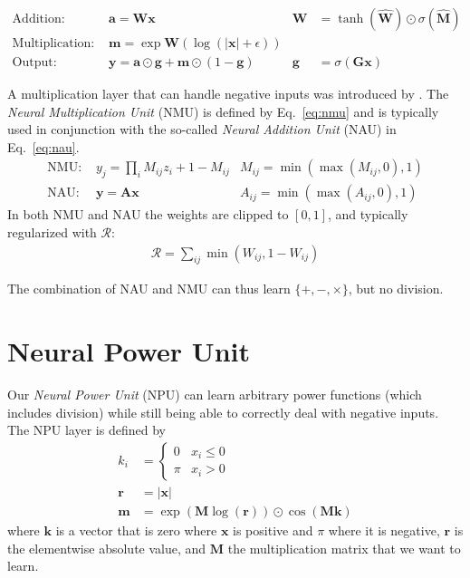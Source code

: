 \documentclass[9pt]{article}
\begin{document}
\begin{align}
  \label{eq:nalu_add}
  \text{Addition: }       & \bm a = \bm W \bm x
                          & \bm W& = \tanh(\hat{\bm W}) \odot \sigma(\hat{\bm M}) \\
  \label{eq:nalu_mult}
  \text{Multiplication: } & \bm m = \exp \bm W(\log(|\bm x|+\epsilon)) & &\\
  \text{Output: }         & \bm y = \bm a \odot \bm g + \bm m \odot (1-\bm g) 
                          & \bm g& = \sigma(\bm G\bm x)
\end{align}

A multiplication layer that can handle negative inputs was introduced by \citet{madsen_neural_2020}.
The \emph{Neural Multiplication Unit} (NMU) is defined by Eq.~\ref{eq:nmu} and is typically used in
conjunction with the so-called \emph{Neural Addition Unit} (NAU) in Eq.~\ref{eq:nau}.
\begin{align}
  \label{eq:nmu}
  \text{NMU: } &y_j = \prod_i M_{ij} z_{i} + 1 - M_{ij}  &M_{ij}=\min(\max(M_{ij}, 0), 1)\\
  \label{eq:nau}
  \text{NAU: } &\bm y = \bm A \bm x &A_{ij}=\min(\max(A_{ij}, 0), 1)
\end{align}
In both NMU and NAU the weights are clipped to $[0,1]$, and typically regularized
with $\mathcal{R}$:
\begin{align}
  \label{eq:rsparse}
  \mathcal{R} = \sum_{ij} \min(W_{ij}, 1-W_{ij})
\end{align}

The combination of NAU and NMU can thus learn $\{+,-,\times\}$, but no division.




\section{Neural Power Unit}%
\label{sec:neural_power_unit}

Our \emph{Neural Power Unit} (NPU) can learn arbitrary power functions (which
includes division) while still being able to correctly deal with negative
inputs.  The NPU layer is defined by
\begin{align}
  k_i &= \begin{cases}
     0  & x_i \leq 0 \\
    \pi & x_i > 0
  \end{cases} \\
  \bm r &= |\bm x| \\
  \bm m &= \exp(\bm M \log(\bm r)) \odot \cos(\bm M \bm k)
\end{align}
where $\bm k$ is a vector that is zero where $\bm x$ is positive and $\pi$
where it is negative, $\bm r$ is the elementwise absolute value, and $\bm M$
the multiplication matrix that we want to learn.
\end{document}
